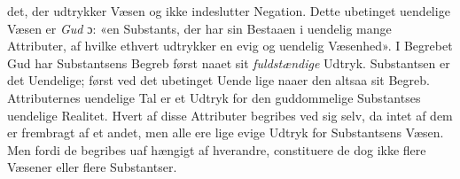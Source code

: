 \documentclass[12pt,a4paper]{book}
\begin{document}
det, der udtrykker Væsen og ikke indeslutter Negation. Dette
ubetinget uendelige Væsen er \emph{Gud} ɔ: «en Substants, der har
sin Bestaaen i uendelig mange Attributer, af hvilke ethvert
udtrykker en evig og uendelig Væsenhed». I Begrebet Gud har
Substantsens Begreb først naaet sit \emph{fuldstændige} Udtryk.
Substantsen er det Uendelige; først ved det ubetinget Uende\-%
lige naaer den altsaa sit Begreb. Attributernes uendelige Tal
er et Udtryk for den guddommelige Substantses uendelige
Realitet. Hvert af disse Attributer begribes ved sig selv, da
intet af dem er frembragt af et andet, men alle ere lige evige
Udtryk for Substantsens Væsen. Men fordi de begribes uaf\-%
hængigt af hverandre, constituere de dog ikke flere Væsener
eller flere Substantser.
\end{document}

